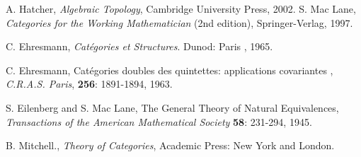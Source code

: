 \documentclass{article}
\begin{document}
\begin{thebibliography}{9}

A. Hatcher, \emph{Algebraic Topology}, Cambridge University Press, 2002.
S. Mac Lane, \emph{Categories for the Working Mathematician} (2nd edition), Springer-Verlag, 1997.


C. Ehresmann, \emph{Cat\'egories et Structures}. Dunod: Paris , 1965.

C. Ehresmann, Cat\'egories doubles des quintettes: applications covariantes
, \emph{C.R.A.S. Paris}, \textbf{256}: 1891-1894, 1963.



S. Eilenberg and S. Mac Lane,  The General Theory of Natural Equivalences, \emph{Transactions of the American Mathematical Society} \textbf{58}: 231-294, 1945.



B. Mitchell., \emph{Theory of Categories}, Academic Press: New York and London.


\end{thebibliography}
\end{document}
